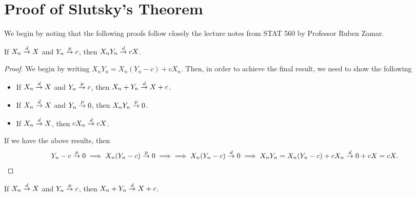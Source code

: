 

\section{Proof of Slutsky's Theorem} \label{appx:slu}
We begin by noting that the following proofs follow closely the lecture notes from STAT 560 by Professor Ruben Zamar.
\begin{theorem}
If $X_n \overset{d}{\rightarrow} X$ and $Y_n \overset{p}{\rightarrow} c$, then $X_nY_n \overset{d}{\rightarrow} cX$.
\end{theorem}
\begin{proof}
We begin by writing $X_nY_n = X_n(Y_n-c)+cX_n$. Then, in order to achieve the final result, we need to show the following
\begin{itemize}
\item If $X_n \overset{d}{\rightarrow} X$ and $Y_n \overset{p}{\rightarrow} c$, then $X_n + Y_n \overset{d}{\rightarrow} X + c$.
\item If $X_n \overset{d}{\rightarrow} X$ and $Y_n \overset{p}{\rightarrow} 0$, then $X_nY_n \overset{p}{\rightarrow} 0$.
\item If $X_n \overset{d}{\rightarrow} X$, then $cX_n \overset{d}{\rightarrow} cX$.
\end{itemize}
If we have the above results, then 
\begin{align*}
Y_n - c \overset{p}{\rightarrow} 0 \implies X_n(Y_n-c) \overset{p}{\rightarrow} 0 \implies \implies X_n(Y_n-c) \overset{d}{\rightarrow} 0 \implies X_nY_n = X_n(Y_n-c)+cX_n \overset{d}{\rightarrow} 0 + cX = cX.
\end{align*}
\end{proof}
\begin{lemma}
If $X_n \overset{d}{\rightarrow} X$ and $Y_n \overset{p}{\rightarrow} c$, then $X_n + Y_n \overset{d}{\rightarrow} X + c$.
\end{lemma}
